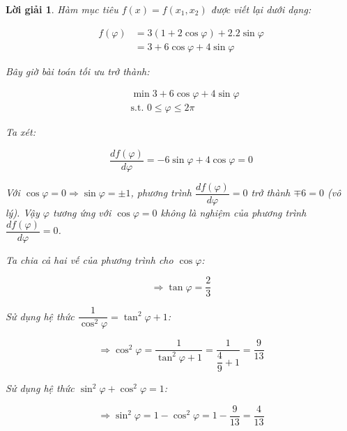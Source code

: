 \documentclass[14pt, a4paper]{article}
\theoremstyle{sltheorem}
\theoremstyle{soltheorem}
\newtheorem*{loigiai}{Lời giải}
\begin{document}
\begin{loigiai}
        Hàm mục tiêu $f(x)=f(x_1, x_2)$ được viết lại dưới dạng:

        \begin{equation*}
            \begin{aligned}
            f(\varphi) &= 3(1 + 2\cos \varphi) + 2.2 \sin \varphi \\
            & = 3 + 6 \cos \varphi + 4 \sin \varphi
            \end{aligned}
        \end{equation*}

        Bây giờ bài toán tối ưu trở thành:

        \begin{equation*}
            \begin{aligned}
                &\min 3 + 6 \cos \varphi + 4 \sin \varphi \\
                &\text{s.t. } 0 \leq \varphi \leq 2\pi
            \end{aligned}
        \end{equation*}

        Ta xét:

        \begin{equation*}
            \dfrac{d f(\varphi)}{d \varphi}=-6 \sin \varphi + 4 \cos \varphi=0
        \end{equation*}

        Với $\cos \varphi = 0 \Rightarrow \sin \varphi = \pm 1$, phương trình $\dfrac{d f(\varphi)}{d \varphi}=0$ trở thành $\mp 6 = 0$ (vô lý).
        Vậy $\varphi$ tương ứng với $\cos \varphi = 0$ không là nghiệm của phương trình $\dfrac{d f(\varphi)}{d \varphi}=0$.

        Ta chia cả hai vế của phương trình cho $\cos \varphi$:

        \begin{equation*}
            \Rightarrow \tan \varphi = \dfrac{2}{3}
        \end{equation*}

        Sử dụng hệ thức $\dfrac{1}{\cos^2 \varphi}=\tan^2 \varphi + 1$:

        \begin{equation*}
            \Rightarrow \cos^2 \varphi = \dfrac{1}{\tan^2 \varphi + 1}=\dfrac{1}{\dfrac{4}{9} + 1}=\dfrac{9}{13}
        \end{equation*}

        Sử dụng hệ thức $\sin^2 \varphi + \cos^2 \varphi = 1$:

        \begin{equation*}
            \Rightarrow \sin^2 \varphi = 1 - \cos^2 \varphi = 1 - \dfrac{9}{13}=\dfrac{4}{13}
        \end{equation*}


\end{loigiai}
\end{document}

